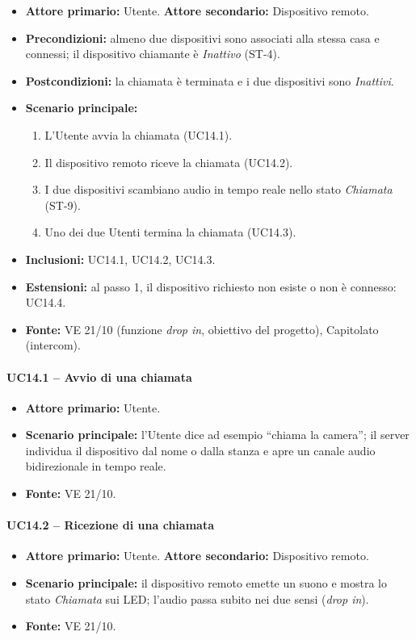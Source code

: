 \documentclass[12pt,a4paper]{article}
\newcommand{\tightlist}{\setlength{\itemsep}{1pt}\setlength{\parskip}{0pt}}
\begin{document}
\begin{itemize}
\tightlist
\item \textbf{Attore primario:} Utente. \textbf{Attore secondario:} Dispositivo remoto.
\item \textbf{Precondizioni:} almeno due dispositivi sono associati alla stessa casa e connessi; il dispositivo chiamante è \emph{Inattivo} (ST-4).
\item \textbf{Postcondizioni:} la chiamata è terminata e i due dispositivi sono \emph{Inattivi}.
\item \textbf{Scenario principale:}
\begin{enumerate}
\tightlist
\item L'Utente avvia la chiamata (UC14.1).
\item Il dispositivo remoto riceve la chiamata (UC14.2).
\item I due dispositivi scambiano audio in tempo reale nello stato \emph{Chiamata} (ST-9).
\item Uno dei due Utenti termina la chiamata (UC14.3).
\end{enumerate}
\item \textbf{Inclusioni:} UC14.1, UC14.2, UC14.3.
\item \textbf{Estensioni:} al passo 1, il dispositivo richiesto non esiste o non è connesso: UC14.4.
\item \textbf{Fonte:} VE 21/10 (funzione \emph{drop in}, obiettivo del progetto), Capitolato (intercom).
\end{itemize}

\paragraph{UC14.1 -- Avvio di una chiamata}
\begin{itemize}
\tightlist
\item \textbf{Attore primario:} Utente.
\item \textbf{Scenario principale:} l'Utente dice ad esempio ``chiama la camera''; il server individua il dispositivo dal nome o dalla stanza e apre un canale audio bidirezionale in tempo reale.
\item \textbf{Fonte:} VE 21/10.
\end{itemize}

\paragraph{UC14.2 -- Ricezione di una chiamata}
\begin{itemize}
\tightlist
\item \textbf{Attore primario:} Utente. \textbf{Attore secondario:} Dispositivo remoto.
\item \textbf{Scenario principale:} il dispositivo remoto emette un suono e mostra lo stato \emph{Chiamata} sui LED; l'audio passa subito nei due sensi (\emph{drop in}).
\item \textbf{Fonte:} VE 21/10.
\end{itemize}
\end{document}
